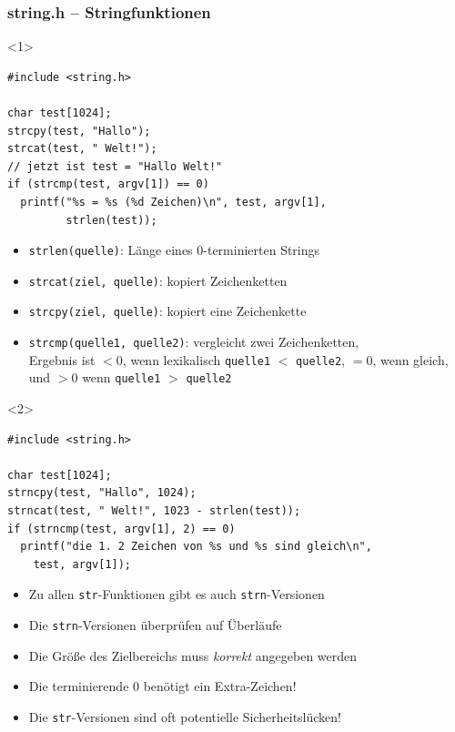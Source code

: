 \documentclass{slides}
\begin{document}
\begin{frame}[fragile]
  \frametitle{string.h -- Stringfunktionen}
  \begin{onlyenv}<1>
\begin{lstlisting}[emph={strlen,strcat,strcmp,strcpy}]
#include <string.h>

char test[1024];
strcpy(test, "Hallo");
strcat(test, " Welt!");
// jetzt ist test = "Hallo Welt!"
if (strcmp(test, argv[1]) == 0)
  printf("%s = %s (%d Zeichen)\n", test, argv[1],
         strlen(test));
\end{lstlisting}

    \begin{itemize}
    \item \lstinline!strlen(quelle)!: Länge eines 0-terminierten Strings
    \item \lstinline!strcat(ziel, quelle)!: kopiert Zeichenketten
    \item \lstinline!strcpy(ziel, quelle)!: kopiert eine Zeichenkette
    \item \lstinline!strcmp(quelle1, quelle2)!: vergleicht zwei Zeichenketten,\\
      Ergebnis ist $<0$, wenn lexikalisch \lstinline!quelle1! $<$ \lstinline!quelle2!, $=0$, wenn
      gleich, und $>0$ wenn \lstinline!quelle1! $>$ \lstinline!quelle2!
    \end{itemize}
  \end{onlyenv}

  \begin{onlyenv}<2>
\begin{lstlisting}[emph={strncat,strncmp,strncpy}]
#include <string.h>

char test[1024];
strncpy(test, "Hallo", 1024);
strncat(test, " Welt!", 1023 - strlen(test));
if (strncmp(test, argv[1], 2) == 0)
  printf("die 1. 2 Zeichen von %s und %s sind gleich\n",
    test, argv[1]);
\end{lstlisting}

    \begin{itemize}
    \item Zu allen \lstinline!str!-Funktionen gibt es auch \lstinline!strn!-Versionen
    \item Die \lstinline!strn!-Versionen überprüfen auf Überläufe
    \item Die Größe des Zielbereichs muss \emph{korrekt} angegeben werden
    \item Die terminierende 0 benötigt ein Extra-Zeichen!
    \item Die \lstinline!str!-Versionen sind oft potentielle Sicherheitslücken!
    \end{itemize}
  \end{onlyenv}
\end{frame}
\end{document}
